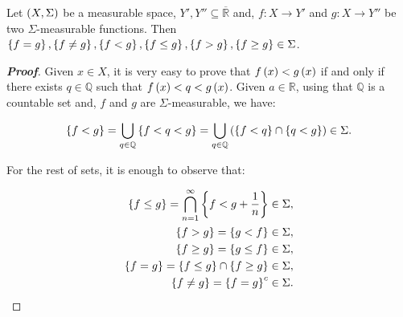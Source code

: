 \begin{proposition}
  Let $\left(X,\Sigma\right)$ be a measurable space, $Y',Y''\subseteq\overline{\mathbb{R}}$ and, $f:X\rightarrow Y'$ and $g:X\rightarrow Y''$ be two $\Sigma$-measurable functions. Then $\left\{f=g\right\},\left\{f\neq g\right\},\left\{f<g\right\},\left\{f\leq g\right\},\left\{f>g\right\},\left\{f\geq g\right\}\in\Sigma$.

  \begin{proof}[\rm\textbf{Proof}]
    Given $x\in X$, it is very easy to prove that $f\left(x\right)<g\left(x\right)$ if and only if there exists $q\in\mathbb{Q}$ such that $f\left(x\right)<q<g\left(x\right)$. Given $a\in\mathbb{R}$, using that $\mathbb{Q}$ is a countable set and, $f$ and $g$ are $\Sigma$-measurable, we have:

    \begin{equation}
      \left\{f<g\right\}=\bigcup_{q\in\mathbb{Q}}{\left\{f<q<g\right\}}=\bigcup_{q\in\mathbb{Q}}{\left(\left\{f<q\right\}\cap\left\{q<g\right\}\right)}\in\Sigma.
    \end{equation}

    For the rest of sets, it is enough to observe that:

    \begin{equation}
      \begin{split}
        \left\{f\leq g\right\}=\bigcap_{n=1}^{\infty}{\left\{f<g+\frac{1}{n}\right\}}\in\Sigma,\\
        \left\{f>g\right\}=\left\{g<f\right\}\in\Sigma,\\
        \left\{f\geq g\right\}=\left\{g\leq f\right\}\in\Sigma,\\
        \left\{f=g\right\}=\left\{f\leq g\right\}\cap\left\{f\geq g\right\}\in\Sigma,\\
        \left\{f\neq g\right\}=\left\{f=g\right\}^c\in\Sigma.
      \end{split}
    \end{equation}
  \end{proof}
\end{proposition}

